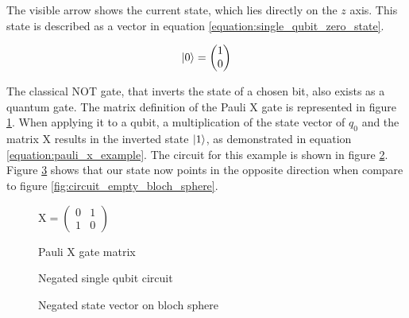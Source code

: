 The visible arrow shows the current state, which lies directly on the $z$ axis. This state is described as a vector in equation \ref{equation:single_qubit_zero_state}.

\begin{equation}
    \ket{0} = \begin{pmatrix}1 \\ 0\end{pmatrix}
    \label{equation:single_qubit_zero_state}
\end{equation}

The classical NOT gate, that inverts the state of a chosen bit, also exists as a quantum gate. The matrix definition of the Pauli $\mathrm{X}$ gate is represented in figure \ref{fig:matrix_pauli_x}. When applying it to a qubit, a multiplication of the state vector of $q_0$ and the matrix $\mathrm{X}$ results in the inverted state $\ket{1}$, as demonstrated in equation \ref{equation:pauli_x_example}. The circuit for this example is shown in figure \ref{fig:circuit_negated_empty}. Figure \ref{fig:circuit_negated_empty_bloch_sphere} shows that our state now points in the opposite direction when compare to figure \ref{fig:circuit_empty_bloch_sphere}.

\begin{figure}
    \centering
    $\mathrm{X} = \begin{pmatrix}
        0 & 1 \\
        1 & 0
    \end{pmatrix}$
    \caption{Pauli X gate matrix}
    \label{fig:matrix_pauli_x}
\end{figure}

\begin{figure}[!h]
    \centering
    \caption{Negated single qubit circuit}
    \label{fig:circuit_negated_empty}
\end{figure}

\begin{figure}[!h]
    \centering
    \caption{Negated state vector on bloch sphere}
    \label{fig:circuit_negated_empty_bloch_sphere}
\end{figure}

